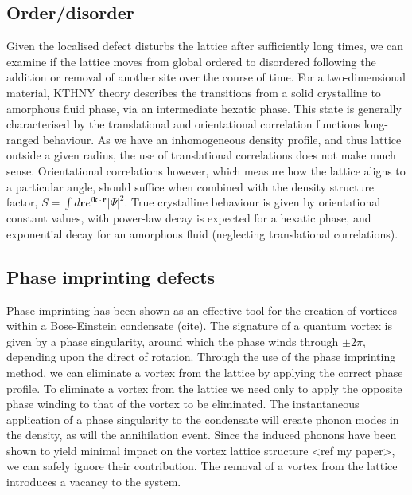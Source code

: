 \subsection{Order/disorder}
Given the localised defect disturbs the lattice after sufficiently long times, we can examine if the lattice moves from global ordered to
disordered following the addition or removal of another site over the course of time. For a two-dimensional material, KTHNY theory describes
the transitions from a solid crystalline to amorphous fluid phase, via an intermediate hexatic phase. This state is generally characterised
by the translational and orientational correlation functions long-ranged behaviour. As we have an inhomogeneous density profile, and thus
lattice outside a given radius, the use of translational correlations does not make much sense. Orientational correlations however, which
measure how the lattice aligns to a particular angle, should suffice when combined with the density structure factor,
$S = \int d\mathbf{r}e^{i\mathbf{k}\cdot\mathbf{r}}|\Psi|^2$. True crystalline behaviour is given by orientational constant values, with
power-law decay is expected for a hexatic phase, and exponential decay for an amorphous fluid (neglecting translational correlations).

\subsection{Phase imprinting defects}
Phase imprinting has been shown as an effective tool for the creation of vortices within a Bose-Einstein condensate (cite). The signature of
a quantum vortex is given by a phase singularity, around which the phase winds through $\pm 2\pi$, depending upon the direct of rotation.
Through the use of the phase imprinting method, we can eliminate a vortex from the lattice by applying the correct phase profile. To
eliminate a vortex from the lattice we need only to apply the opposite phase winding to that of the vortex to be eliminated. The
instantaneous application of a phase singularity to the condensate will create phonon modes in the density, as will the annihilation event.
Since the induced phonons have been shown to yield minimal impact on the vortex lattice structure <ref my paper>, we can safely
ignore their contribution. The removal of a vortex from the lattice introduces a vacancy to the system.


